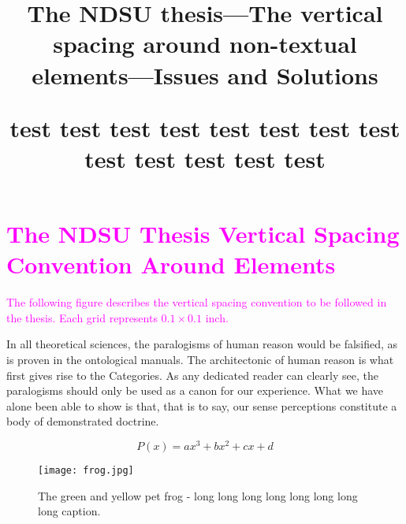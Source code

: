 \documentclass[12pt,mathdesign,showframe,showgrid]{ndsu-thesis-2022}
\title{The NDSU thesis---The vertical spacing around non-textual elements---Issues and Solutions \par test test test test test test test test test test test test test}
\begin{document}


\section{\textcolor{magenta}{The NDSU Thesis Vertical Spacing Convention Around Elements}}

\textcolor{magenta}{The following figure describes the vertical spacing convention to be followed in the thesis. Each grid represents $0.1 \times 0.1$ inch.} 




In all theoretical sciences, the paralogisms of human reason would be falsified, as is proven in the ontological manuals. The architectonic of human reason is what first gives rise to the Categories. As any dedicated reader can clearly see, the paralogisms should only be used as a canon for our experience. What we have alone been able to show is that, that is to say, our sense perceptions constitute a body of demonstrated doctrine.

\newpage

\kant[1-2]


\begin{equation}
P(x) = ax^3+bx^2+cx+d
\end{equation}



\kant[9]


\begin{figure}[h!]
\centering
\texttt{[image: frog.jpg]}
\caption{The green and yellow pet frog - long long long long long long long long caption.}
\end{figure}
\end{document}
